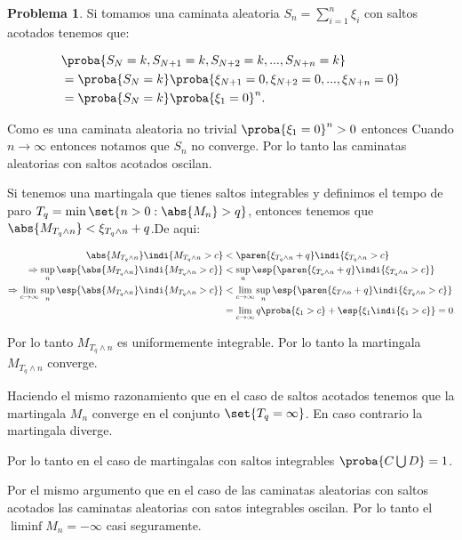 \documentclass[a5paper,oneside]{amsart}
\theoremstyle{plain}
\theoremstyle{definition}
\newtheorem{problema}{Problema}
\begin{document}
\begin{problema}
Si tomamos una caminata aleatoria $S_n=\sum_{i=1}^{n}\xi_i$  con saltos acotados tenemos que:

\begin{align} 
&\proba{S_N=k,S_{N+1}=k,S_{N+2}=k,...,S_{N+n}=k} \notag \\
&=\proba{S_N=k}\proba{\xi_{N+1}=0,\xi_{N+2}=0,...,\xi_{N+n}=0}\notag \\
&=\proba{S_N=k}\proba{\xi_{1}=0}^n. \notag
\end{align}

Como es una caminata aleatoria no trivial $\proba{\xi_{1}=0}^n>0$ entonces Cuando $n\rightarrow\infty $ entonces notamos que $S_n$ no converge. Por lo tanto las caminatas aleatorias con saltos acotados oscilan.

Si tenemos una martingala que tienes saltos integrables y definimos el tempo de paro $T_q=\min \set{n>0 : \abs{M_n}>q}$, entonces tenemos que $\abs{M_{T_q\wedge n}}<\xi_{T_q\wedge n}+q$.De aqui:

\begin{align}
\abs{M_{T_q\wedge n}}\indi{M_{T_q\wedge n}>c}&<\paren{\xi_{T_q\wedge n}+q}\indi{\xi_{T_q\wedge n}>c}\notag \\
\Rightarrow\sup_n\esp{\abs{M_{T_q\wedge n}}\indi{M_{T_q\wedge n}>c}}&<\sup_n\esp{ \paren{\xi_{T_q\wedge n}+q}\indi{\xi_{T_q\wedge n}>c}}\notag \\
\Rightarrow\lim_{c\rightarrow \infty}\sup_n\esp{\abs{M_{T_q\wedge n}}\indi{M_{T_q\wedge n}>c}}&< \lim_{c\rightarrow \infty} \sup_n \esp{\paren{\xi_{T\wedge n}+q}\indi{\xi_{T_q\wedge n}>c}} \notag \\
&=\lim_{c\rightarrow \infty} q \proba{\xi_1 >c }+\esp{\xi_{1}\indi{\xi_{1}>c}}=0 \notag
\end{align}

Por lo tanto $M_{T_q\wedge n}$ es uniformemente integrable. Por lo tanto la martingala $M_{T_q\wedge n}$ converge.

Haciendo el mismo razonamiento que en el caso de saltos acotados tenemos que la martingala $M_n$ converge en el conjunto $\set{T_q=\infty}$. En caso contrario la martingala diverge.

Por lo tanto en el caso de martingalas con saltos integrables $\proba{C\bigcup D}=1$.

Por el mismo argumento que en el caso de las caminatas aleatorias con saltos acotados las caminatas aleatorias con satos integrables oscilan. Por lo tanto el $\liminf M_n=-\infty$ casi seguramente.

\end{problema}
\end{document}
